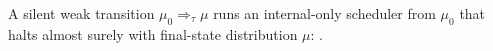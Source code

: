 \begin{definition}
  \label{def:weaktau}
  \leanok
  A silent weak transition $\mu_0 \Rightarrow_\tau \mu$ runs an internal-only scheduler from $\mu_0$ that halts almost surely with final-state distribution $\mu$: .
\end{definition}
